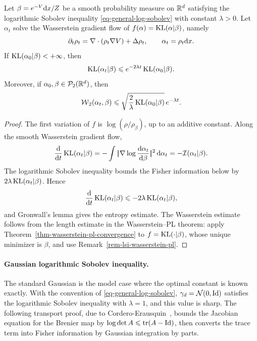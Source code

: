 \begin{prop}\label{prop-lsi-entropy-decay}
	Let \(\beta=e^{-V}\mathrm{d} x/Z\) be a smooth probability measure on \(\mathbb{R}^d\) satisfying the logarithmic Sobolev inequality \eqref{eq-general-log-sobolev} with constant \(\lambda>0\). Let \(\alpha_t\) solve the Wasserstein gradient flow of \(f(\alpha)=\operatorname{KL}(\alpha|\beta)\), namely
	\[
		\partial_t\rho_t
		=
		\nabla\cdot(\rho_t\nabla V)+\Delta\rho_t,
		\qquad
		\alpha_t=\rho_t\mathrm{d} x.
	\]
	If \(\operatorname{KL}(\alpha_0|\beta)<+\infty\), then
	\[
		\operatorname{KL}(\alpha_t|\beta)
		\leqslant
		e^{-2\lambda t}\operatorname{KL}(\alpha_0|\beta).
	\]
	Moreover, if \(\alpha_0,\beta\in\mathcal{P}_2(\mathbb{R}^d)\), then
	\[
		\operatorname{\mathcal{W}}_2(\alpha_t,\beta)
		\leqslant
		\sqrt{\frac{2}{\lambda}\operatorname{KL}(\alpha_0|\beta)}\,e^{-\lambda t}.
	\]
\end{prop}

\begin{proof}
	The first variation of \(f\) is \(\log(\rho/\rho_\beta)\), up to an additive constant. Along the smooth Wasserstein gradient flow,
	\[
		\frac{\mathrm{d}}{\mathrm{d} t}\operatorname{KL}(\alpha_t|\beta)
		=
		-\int |\!| \nabla\log\frac{\mathrm{d}\alpha_t}{\mathrm{d}\beta} |\!|^2\,\mathrm{d}\alpha_t
		=
		-\mathcal I(\alpha_t|\beta).
	\]
	The logarithmic Sobolev inequality bounds the Fisher information below by \(2\lambda\operatorname{KL}(\alpha_t|\beta)\). Hence
	\[
		\frac{\mathrm{d}}{\mathrm{d} t}\operatorname{KL}(\alpha_t|\beta)
		\leqslant
		-2\lambda\operatorname{KL}(\alpha_t|\beta),
	\]
	and Gronwall's lemma gives the entropy estimate. The Wasserstein estimate follows from the length estimate in the Wasserstein--PL theorem: apply Theorem~\ref{thm-wasserstein-pl-convergence} to \(f=\operatorname{KL}(\cdot|\beta)\), whose unique minimizer is \(\beta\), and use Remark~\ref{rem-lsi-wasserstein-pl}.
\end{proof}

\paragraph{Gaussian logarithmic Sobolev inequality.}
The standard Gaussian is the model case where the optimal constant is known exactly. With the convention of \eqref{eq-general-log-sobolev}, \(\gamma_d=\mathcal{N}(0,\mathrm{Id})\) satisfies the logarithmic Sobolev inequality with \(\lambda=1\), and this value is sharp. The following transport proof, due to Cordero-Erausquin~\cite{CorderoErausquin2002GaussianMassTransport}, bounds the Jacobian equation for the Brenier map by \(\log\det A\leqslant\operatorname{tr}(A-\mathrm{Id})\), then converts the trace term into Fisher information by Gaussian integration by parts.

